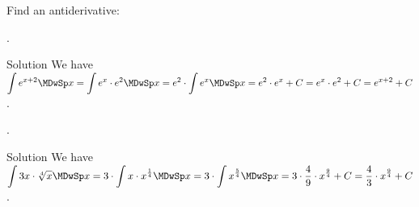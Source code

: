 \begin{MExercises}
\begin{MExercise}
Find an antiderivative:
\begin{MExerciseItems}
\item{.}
\begin{MHint}{Solution}
We have
$\displaystyle \int \MEU^{x+2} \MDwSp x = %
\int \MEU^x \cdot \MEU^2 \MDwSp x = %
\MEU^2 \cdot \int \MEU^x \MDwSp x = %
\MEU^2 \cdot \MEU^x + C = %
\MEU^x \cdot \MEU^2 + C = %
\MEU^{x + 2} + C$.
\end{MHint}
%
\item{.}
\begin{MHint}{Solution}
We have
$\displaystyle \int 3 x \cdot \sqrt[4]{x} \MDwSp x = %
3 \cdot \int x \cdot x^{\frac{1}{4}} \MDwSp x = %
3 \cdot \int x^{\frac{5}{4}} \MDwSp x = %
3 \cdot \frac{4}{9} \cdot x^{\frac{9}{4}} + C = %
\frac{4}{3} \cdot x^{\frac{9}{4}} + C$.
\end{MHint}
\end{MExerciseItems}
\jHTMLHinweisEingabeFunktionenExp
\end{MExercise}

%


\end{MExercises}
